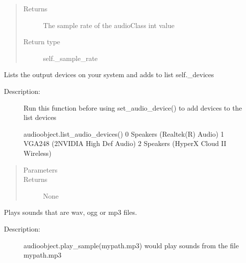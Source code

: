 \documentclass[letterpaper,10pt,english]{sphinxmanual}
\begin{document}
\begin{fulllineitems}
\begin{fulllineitems}
\begin{quote}
\begin{description}
\item[{Returns}] \leavevmode
\sphinxAtStartPar
The sample rate of the audioClass \sphinxhyphen{} int value

\item[{Return type}] \leavevmode
\sphinxAtStartPar
self.\_sample\_rate

\end{description}\end{quote}

\end{fulllineitems}


\begin{fulllineitems}
\label{\detokenize{dpav:dpav.audio.Audio.list_audio_devices}}
\sphinxAtStartPar
Lists the output devices on your system and adds to list self.\_devices
\begin{description}
\item[{Description:}] \leavevmode
\sphinxAtStartPar
Run this function before using set\_audio\_device() to add devices to the list devices

\sphinxAtStartPar
audioobject.list\_audio\_devices()
0 Speakers (Realtek(R) Audio)
1 VGA248 (2\sphinxhyphen{}NVIDIA High Def Audio)
2 Speakers (HyperX Cloud II Wireless)

\end{description}
\begin{quote}\begin{description}
\item[{Parameters}] \leavevmode
\sphinxAtStartPar
{} \textendash{} 

\item[{Returns}] \leavevmode
\sphinxAtStartPar
None

\end{description}\end{quote}

\end{fulllineitems}


\begin{fulllineitems}
\label{\detokenize{dpav:dpav.audio.Audio.play_sample}}
\sphinxAtStartPar
Plays sounds that are wav, ogg or mp3 files.
\begin{description}
\item[{Description:}] \leavevmode
\sphinxAtStartPar
audioobject.play\_sample(mypath.mp3) would play sounds from the file mypath.mp3


\end{description}
\end{fulllineitems}
\end{fulllineitems}
\end{document}
